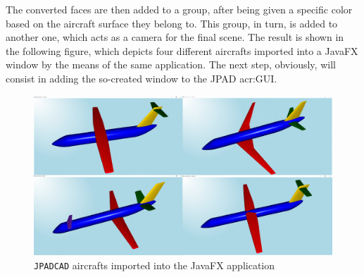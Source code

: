 \bigskip
\noindent
The converted faces are then added to a group, after being given a specific color based on the aircraft surface they belong to. This group, in turn, is added to another one, which acts as a camera for the final scene. The result is shown in the following figure, which depicts four different aircrafts imported into a JavaFX window by the means of the same application. The next step, obviously, will consist in adding the so-created window to the \gls{JPAD} \gls{acr:GUI}.
%
\begin{figure}[H]
\centering
\includegraphics[scale=0.51]{Immagini/Appendice/javafx_01}
\caption{\lstinline[language=Java]!JPADCAD! aircrafts imported into the JavaFX application}
\label{fig:javafx_01}
\end{figure}
% 